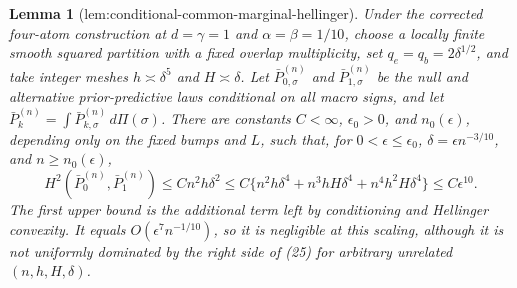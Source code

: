 \documentclass{article}
\newtheorem{lemma}{Lemma}
\begin{document}
\begin{lemma}[lem:conditional-common-marginal-hellinger]\label{lem:conditional-common-marginal-hellinger}
Under the corrected four-atom construction at \(d=\gamma=1\) and \(\alpha=\beta=1/10\), choose a locally finite smooth squared partition with a fixed overlap multiplicity, set \(q_e=q_b=2\delta^{1/2}\), and take integer meshes \(h\asymp\delta^5\) and \(H\asymp\delta\).  Let \(\bar P_{0,\sigma}^{(n)}\) and \(\bar P_{1,\sigma}^{(n)}\) be the null and alternative prior-predictive laws conditional on all macro signs, and let \(\bar P_k^{(n)}=\int\bar P_{k,\sigma}^{(n)}\,d\Pi(\sigma)\).  There are constants \(C<\infty\), \(\epsilon_0>0\), and \(n_0(\epsilon)\), depending only on the fixed bumps and \(L\), such that, for \(0<\epsilon\leq\epsilon_0\), \(\delta=\epsilon n^{-3/10}\), and \(n\geq n_0(\epsilon)\),
\[
 H^2(\bar P_0^{(n)},\bar P_1^{(n)})
 \leq Cn^2h\delta^2
 \leq C\{n^2h\delta^4+n^3hH\delta^4+n^4h^2H\delta^4\}
 \leq C\epsilon^{10}.
 \tag{25}
\]
The first upper bound is the additional term left by conditioning and Hellinger convexity.  It equals \(O(\epsilon^7n^{-1/10})\), so it is negligible at this scaling, although it is not uniformly dominated by the right side of (25) for arbitrary unrelated \((n,h,H,\delta)\).
\end{lemma}
\end{document}
